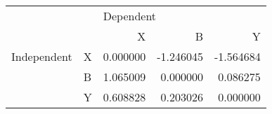 \begin{tabular}{llrrr}
\toprule
            &   & \multicolumn{3}{l}{Dependent} \\
            &   &         X &         B &         Y \\
\midrule
Independent & X &  0.000000 & -1.246045 & -1.564684 \\
            & B &  1.065009 &  0.000000 &  0.086275 \\
            & Y &  0.608828 &  0.203026 &  0.000000 \\
\bottomrule
\end{tabular}
